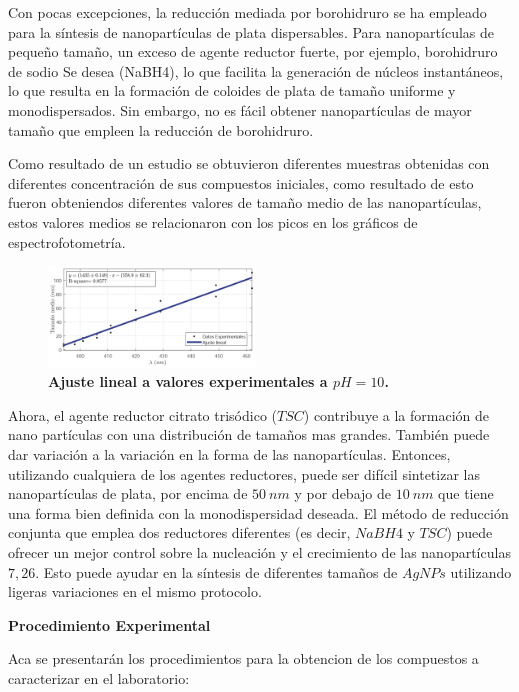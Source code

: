 Con pocas excepciones, la reducción mediada por borohidruro se ha empleado para la síntesis de nanopartículas de plata dispersables. Para nanopartículas de pequeño tamaño, un exceso de agente reductor fuerte, por ejemplo, borohidruro de sodio Se desea (NaBH4), lo que facilita la generación de núcleos instantáneos, lo que resulta en la formación de coloides de plata de tamaño uniforme y monodispersados. Sin embargo, no es fácil obtener nanopartículas de mayor tamaño que empleen la reducción de borohidruro.

Como resultado de un estudio se obtuvieron diferentes muestras obtenidas con diferentes concentración de sus compuestos iniciales, como resultado de esto fueron obteniendos diferentes valores de tamaño medio de las nanopartículas, estos valores medios se relacionaron con los picos en los gráficos de espectrofotometría. 
\begin{figure}
    \includegraphics[width=0.49\textwidth]{Tarea3/tamano_experimental.png}
    \caption{\textbf{Ajuste lineal a valores experimentales a $pH=10$.}}
    \label{tamano}
\end{figure}


Ahora, el agente reductor citrato trisódico ($TSC$) contribuye a la formación de nano partículas con una distribución de tamaños mas grandes. También puede dar variación a la variación en la forma de las nanopartículas. Entonces, utilizando cualquiera de los agentes reductores, puede ser difícil sintetizar las nanopartículas de plata, por encima de $50~ nm$ y por debajo de $10~nm$ que tiene una forma bien definida con la monodispersidad deseada. El método de reducción conjunta que emplea dos reductores diferentes (es decir, $NaBH4$ y $TSC$) puede ofrecer un mejor control sobre la nucleación y el crecimiento de las nanopartículas $7,26$. Esto puede ayudar en la síntesis de diferentes tamaños de $AgNPs$ utilizando ligeras variaciones en el mismo protocolo.

\textbf{\textcolor{azul50}{Procedimiento Experimental}}

Aca se presentarán los procedimientos para la obtencion de los compuestos a caracterizar en el laboratorio:

